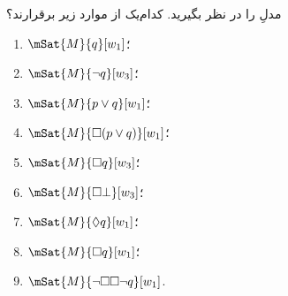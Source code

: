\documentclass[../../../include/open-logic-section]{subfiles}
\begin{document}
\begin{prob}
  مدلِ  را در نظر بگیرید. کدام‌یک از
  موارد زیر برقرارند؟
    \begin{enumerate}
    \item $\mSat{M}{q}[w_1]$؛
    \item $\mSat{M}{\lnot q}[w_3]$؛
    \item $\mSat{M}{p \lor q}[w_1]$؛
    \item $\mSat{M}{\Box (p \lor q)}[w_1]$؛
    \item $\mSat{M}{\Box q}[w_3]$؛
    \item $\mSat{M}{\Box \bot}[w_3]$؛
    \item $\mSat{M}{\Diamond q}[w_1]$؛
    \item $\mSat{M}{\Box q}[w_1]$؛
    \item $\mSat{M}{\lnot \Box\Box \lnot q}[w_1]$.
    \end{enumerate}
\end{prob}
\end{document}
